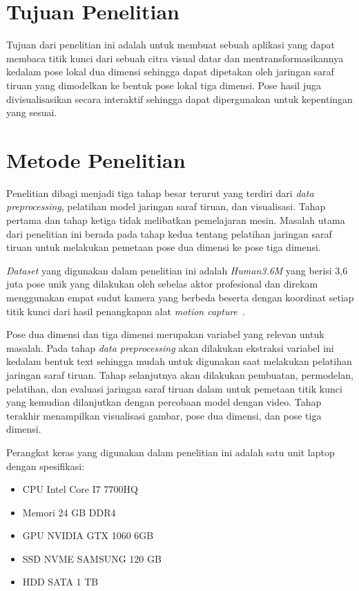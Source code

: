 \section{Tujuan Penelitian}
\label{sec:1-TujuanPenelitian}

Tujuan dari penelitian ini adalah untuk membuat sebuah aplikasi yang dapat membaca titik kunci dari 
sebuah citra visual datar dan mentransformasikannya kedalam pose lokal dua dimensi sehingga dapat 
dipetakan oleh jaringan saraf tiruan yang dimodelkan ke bentuk pose lokal tiga dimensi. Pose hasil
juga divisualisasikan secara interaktif sehingga dapat dipergunakan untuk kepentingan yang sesuai.

\section{Metode Penelitian}
\label{sec:1-MetodePenelitian}

Penelitian dibagi menjadi tiga tahap besar terurut yang terdiri dari \textit{data preprocessing}, 
pelatihan model jaringan saraf tiruan, dan visualisasi. Tahap pertama dan tahap ketiga tidak 
melibatkan pemelajaran mesin. Masalah utama dari penelitian ini berada pada tahap kedua tentang 
pelatihan jaringan saraf tiruan untuk melakukan pemetaan pose dua dimensi ke pose tiga dimensi.

\textit{Dataset} yang digunakan dalam penelitian ini adalah \textit{Human3.6M} yang berisi 3,6 juta 
pose unik yang dilakukan oleh sebelas aktor profesional dan direkam menggunakan empat sudut kamera 
yang berbeda beserta dengan koordinat setiap titik kunci dari hasil penangkapan alat 
\textit{motion capture}~\cite{h36m_pami}.

Pose dua dimensi dan tiga dimensi merupakan variabel yang relevan untuk masalah. Pada tahap 
\textit{data preprocessing} akan dilakukan ekstraksi variabel ini kedalam bentuk text sehingga 
mudah untuk digunakan saat melakukan pelatihan jaringan saraf tiruan. Tahap selanjutnya akan 
dilakukan pembuatan, permodelan, pelatihan, dan evaluasi jaringan saraf tiruan dalam untuk 
pemetaan titik kunci yang kemudian dilanjutkan dengan percobaan model dengan video. Tahap terakhir 
menampilkan visualisasi gambar, pose dua dimensi, dan pose tiga dimensi.

Perangkat keras yang digunakan dalam penelitian ini adalah satu unit laptop dengan spesifikasi:
\begin{itemize}
  \item CPU Intel Core I7 7700HQ
  \item Memori 24 GB DDR4
  \item GPU NVIDIA GTX 1060 6GB
  \item SSD NVME SAMSUNG 120 GB
  \item HDD SATA 1 TB
\end{itemize}


